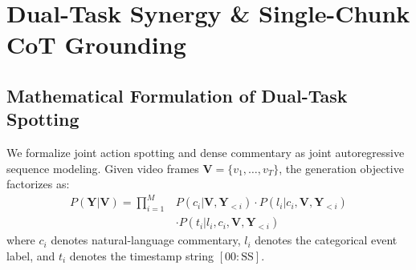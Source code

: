 \documentclass[10pt,twocolumn,letterpaper]{article}
\begin{document}
\begin{table}[h]
\centering
\small
\caption{\textbf{Memory Impact of 4-bit NF4 Quantization at $W=60\text{s}$ (60 Frames).}}
\label{tab:quantization}
\end{table}

\section{Dual-Task Synergy \& Single-Chunk CoT Grounding}
\label{sec:rq3}

\subsection{Mathematical Formulation of Dual-Task Spotting}
We formalize joint action spotting and dense commentary as joint autoregressive sequence modeling. Given video frames $\mathbf{V} = \{v_1, \dots, v_T\}$, the generation objective factorizes as:
\begin{align}
    P(\mathbf{Y}|\mathbf{V}) = \prod_{i=1}^M & P(c_i | \mathbf{V}, \mathbf{Y}_{<i}) \cdot P(l_i | c_i, \mathbf{V}, \mathbf{Y}_{<i}) \nonumber \\
    & \cdot P(t_i | l_i, c_i, \mathbf{V}, \mathbf{Y}_{<i})
\end{align}
where $c_i$ denotes natural-language commentary, $l_i$ denotes the categorical event label, and $t_i$ denotes the timestamp string $[00:\text{SS}]$.
\end{document}

